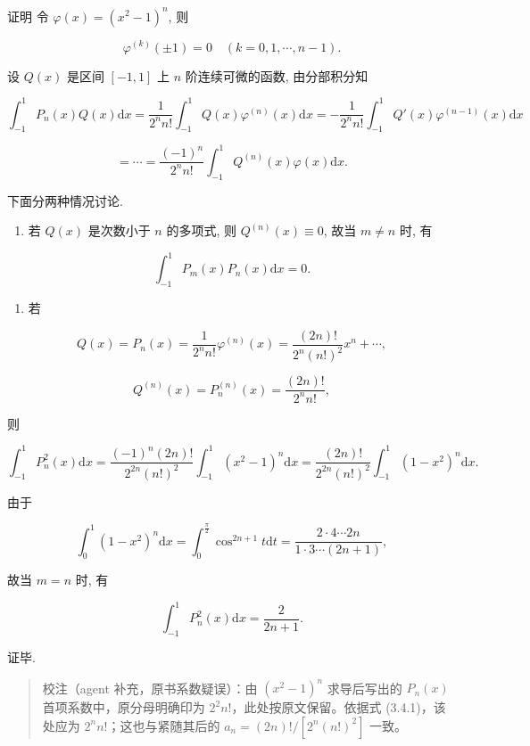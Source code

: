 \documentclass[
  10pt,
  fontset=fandol]{ctexart}
\providecommand{\tightlist}{%
  \setlength{\itemsep}{0pt}\setlength{\parskip}{0pt}}
\begin{document}
证明 令 \(\varphi(x) = (x^2 - 1)^n\), 则

\[
\varphi^{(k)}(\pm 1) = 0 \quad (k = 0, 1, \cdots, n - 1).
\]

设 \(Q(x)\) 是区间 \([-1, 1]\) 上 \(n\) 阶连续可微的函数, 由分部积分知

\[
\int_{-1}^{1} P_n(x) Q(x) \mathrm{d}x = \frac{1}{2^n n!} \int_{-1}^{1} Q(x) \varphi^{(n)}(x) \mathrm{d}x = -\frac{1}{2^n n!} \int_{-1}^{1} Q'(x) \varphi^{(n-1)}(x) \mathrm{d}x
\]

\[
= \cdots = \frac{(-1)^n}{2^n n!} \int_{-1}^{1} Q^{(n)}(x) \varphi(x) \mathrm{d}x.
\]

下面分两种情况讨论.

\begin{enumerate}
\def\labelenumi{(\arabic{enumi})}
\tightlist
\item
  若 \(Q(x)\) 是次数小于 \(n\) 的多项式, 则 \(Q^{(n)}(x) \equiv 0\), 故当 \(m \neq n\) 时, 有
\end{enumerate}

\[
\int_{-1}^{1} P_m(x) P_n(x) \mathrm{d}x = 0.
\]

\begin{enumerate}
\def\labelenumi{(\arabic{enumi})}
\setcounter{enumi}{1}
\tightlist
\item
  若
\end{enumerate}

\[
Q(x) = P_n(x) = \frac{1}{2^n n!} \varphi^{(n)}(x) = \frac{(2n)!}{2^n (n!)^2} x^n + \cdots,
\]

\[
Q^{(n)}(x) = P_n^{(n)}(x) = \frac{(2n)!}{2^n n!},
\]

则

\[
\int_{-1}^{1} P_n^2(x) \mathrm{d}x = \frac{(-1)^n (2n)!}{2^{2n} (n!)^2} \int_{-1}^{1} (x^2 - 1)^n \mathrm{d}x = \frac{(2n)!}{2^{2n} (n!)^2} \int_{-1}^{1} (1 - x^2)^n \mathrm{d}x.
\]

由于

\[
\int_{0}^{1} (1 - x^2)^n \mathrm{d}x = \int_{0}^{\frac{\pi}{2}} \cos^{2n+1} t \mathrm{d}t = \frac{2 \cdot 4 \cdots 2n}{1 \cdot 3 \cdots (2n+1)},
\]

故当 \(m = n\) 时, 有

\[
\int_{-1}^{1} P_n^2(x) \mathrm{d}x = \frac{2}{2n+1}.
\]

证毕.

\begin{quote}
校注（agent 补充，原书系数疑误）：由 \((x^2-1)^n\) 求导后写出的 \(P_n(x)\) 首项系数中，原分母明确印为 \(2^2n!\)，此处按原文保留。依据式 (3.4.1)，该处应为 \(2^nn!\)；这也与紧随其后的 \(a_n=(2n)!/[2^n(n!)^2]\) 一致。
\end{quote}
\end{document}
